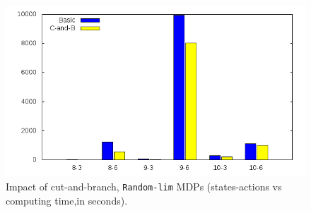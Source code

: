 \begin{figure}[]
	\begin{center}
    \includegraphics[scale=0.45]{GNUPLOT/output_trident.png}
	\end{center}
	\caption{Impact of cut-and-branch, \texttt{Random-lim} MDPs (states-actions vs computing time,in seconds).}
	\label{fig:impact_trident} 
\end{figure}
